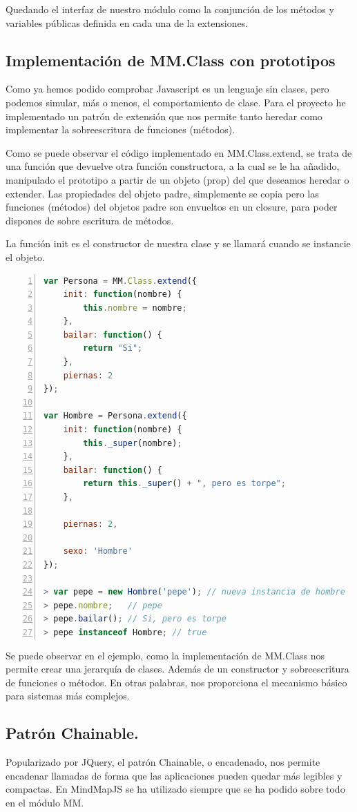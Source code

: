 Quedando el interfaz de nuestro módulo como la conjunción de los métodos y variables públicas definida en cada una de la extensiones.


\subsection{Implementación de MM.Class con prototipos}
Como ya hemos podido comprobar Javascript es un lenguaje sin clases, pero podemos simular, más o menos, el comportamiento de clase. Para el proyecto he implementado un patrón de extensión que nos permite tanto heredar como implementar la sobreescritura de funciones (métodos). 




Como se puede observar el código implementado en MM.Class.extend, se trata de una función que devuelve otra función constructora, a la cual se le ha añadido, manipulado el prototipo a partir de un objeto (prop) del que deseamos heredar o extender. Las propiedades del objeto padre, simplemente se copia pero las funciones (métodos) del objetos padre son envueltos en un closure, para poder dispones de sobre escritura de métodos. 

La función init es el constructor de nuestra clase y se llamará cuando se instancie el objeto.

\begin{lstlisting}[language=JavaScript, numbers=left]
var Persona = MM.Class.extend({
	init: function(nombre) {
		this.nombre = nombre;
	},
	bailar: function() {
		return "Si";
	},
	piernas: 2
});

var Hombre = Persona.extend({
	init: function(nombre) {
		this._super(nombre);
	},
	bailar: function() {
		return this._super() + ", pero es torpe";
	},
	
	piernas: 2,
	
	sexo: 'Hombre'
});

> var pepe = new Hombre('pepe'); // nueva instancia de hombre
> pepe.nombre;   // pepe
> pepe.bailar(); // Si, pero es torpe
> pepe instanceof Hombre; // true
\end{lstlisting}

Se puede observar en el ejemplo, como la implementación de MM.Class nos permite crear una jerarquía de clases. Además de un constructor y sobreescritura de funciones o métodos. En otras palabras, nos proporciona el mecanismo básico para sistemas más complejos. 


\subsection{Patrón Chainable.}
Popularizado por JQuery, el patrón Chainable, o encadenado, nos permite encadenar llamadas de forma que las aplicaciones pueden quedar más legibles y compactas. En MindMapJS se ha utilizado siempre que se ha podido sobre todo en el módulo MM. 


